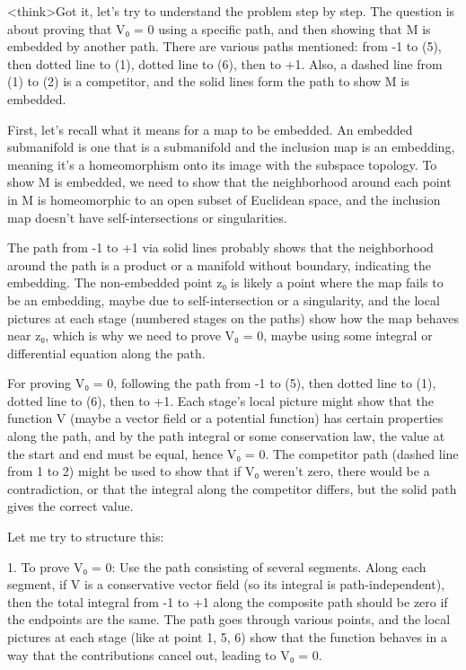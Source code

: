 <think>Got it, let's try to understand the problem step by step. The question is about proving that V₀ = 0 using a specific path, and then showing that M is embedded by another path. There are various paths mentioned: from -1 to (5), then dotted line to (1), dotted line to (6), then to +1. Also, a dashed line from (1) to (2) is a competitor, and the solid lines form the path to show M is embedded.

First, let's recall what it means for a map to be embedded. An embedded submanifold is one that is a submanifold and the inclusion map is an embedding, meaning it's a homeomorphism onto its image with the subspace topology. To show M is embedded, we need to show that the neighborhood around each point in M is homeomorphic to an open subset of Euclidean space, and the inclusion map doesn't have self-intersections or singularities.

The path from -1 to +1 via solid lines probably shows that the neighborhood around the path is a product or a manifold without boundary, indicating the embedding. The non-embedded point z₀ is likely a point where the map fails to be an embedding, maybe due to self-intersection or a singularity, and the local pictures at each stage (numbered stages on the paths) show how the map behaves near z₀, which is why we need to prove V₀ = 0, maybe using some integral or differential equation along the path.

For proving V₀ = 0, following the path from -1 to (5), then dotted line to (1), dotted line to (6), then to +1. Each stage's local picture might show that the function V (maybe a vector field or a potential function) has certain properties along the path, and by the path integral or some conservation law, the value at the start and end must be equal, hence V₀ = 0. The competitor path (dashed line from 1 to 2) might be used to show that if V₀ weren't zero, there would be a contradiction, or that the integral along the competitor differs, but the solid path gives the correct value.

Let me try to structure this:

1. To prove V₀ = 0: Use the path consisting of several segments. Along each segment, if V is a conservative vector field (so its integral is path-independent), then the total integral from -1 to +1 along the composite path should be zero if the endpoints are the same. The path goes through various points, and the local pictures at each stage (like at point 1, 5, 6) show that the function behaves in a way that the contributions cancel out, leading to V₀ = 0.


